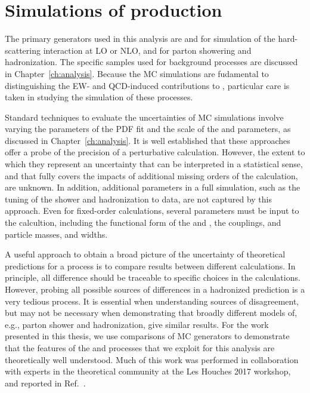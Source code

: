 \section{Simulations of \WZjj production}

The primary generators used in this analysis are \MG and  for simulation
of the hard-scattering interaction at LO or NLO, and  for parton
showering and hadronization. The specific samples used for background processes
are discussed in Chapter~\ref{ch:analysis}. Because the MC simulations are fudamental
to distinguishing the EW- and QCD-induced contributions to \WZjj, particular
care is taken in studying the simulation of these processes.

Standard techniques to evaluate the uncertainties of MC simulations involve
varying the parameters of the PDF fit and the scale of the \muF and \muR parameters,
as discussed in Chapter~\ref{ch:analysis}. 
It is well established that these approaches offer a probe of the precision
of a perturbative calculation. However, the extent to which they represent
an uncertainty that can be interpreted in a statistical sense, and that fully
covers the impacts of additional missing orders of the calculation, are unknown.
In addition, additional parameters in a full simulation, such as the tuning
of the shower and hadronization to data, are not captured by this approach.
Even for fixed-order calculations, several parameters must be input to the calcultion,
including the functional form of the \muF and \muR, the couplings, and particle masses, and
widths. 

A useful approach to obtain a broad picture of the uncertainty of theoretical
predictions for a process is to compare results between different calculations.
In principle, all difference should be traceable to specific choices in the calculations.
However, probing all possible sources of differences in a hadronized prediction is a very
tedious process. It is essential when understanding sources of disagreement, but
may not be necessary when demonstrating that broadly different models of, e.g., parton
shower and hadronization, give similar results.
For the work presented in this thesis, we use comparisons of MC generators to demonstrate that the 
features of the \EWWZ and \QCDWZ processes that we exploit for this analysis 
are theoretically well understood.
Much of this work was performed
in collaboration with experts in the theoretical community at the Les Houches 2017
workshop, and reported in Ref.~\cite{leshouches2017}.

